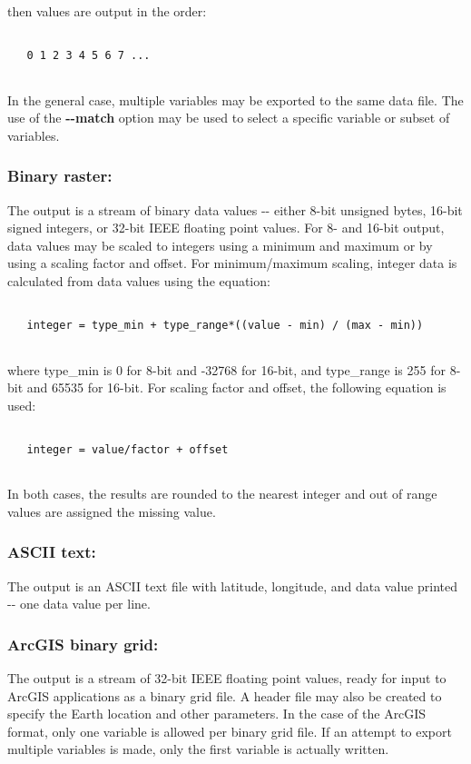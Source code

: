  then values are output in the order:
\begin{verbatim}

   0 1 2 3 4 5 6 7 ...
 
\end{verbatim}


  In the general case, multiple variables may be exported to the same data file. The use of the \textbf{-{-}match}
 option may be used to select a specific variable or subset of variables.
\subsubsection*{Binary raster:}


  The output is a stream of binary data values -{-} either 8-bit unsigned bytes, 16-bit signed integers, or 32-bit IEEE floating point values. For 8- and 16-bit output, data values may be scaled to integers using a minimum and maximum or by using a scaling factor and offset. For minimum/maximum scaling, integer data is calculated from data values using the equation:
\begin{verbatim}

   integer = type_min + type_range*((value - min) / (max - min))
 
\end{verbatim}


 where type\_min is 0 for 8-bit and -32768 for 16-bit, and type\_range is 255 for 8-bit and 65535 for 16-bit. For scaling factor and offset, the following equation is used:
\begin{verbatim}

   integer = value/factor + offset
 
\end{verbatim}


 In both cases, the results are rounded to the nearest integer and out of range values are assigned the missing value.
\subsubsection*{ASCII text:}


 The output is an ASCII text file with latitude, longitude, and data value printed -{-} one data value per line.
\subsubsection*{ArcGIS binary grid:}


 The output is a stream of 32-bit IEEE floating point values, ready for input to ArcGIS applications as a binary grid file. A header file may also be created to specify the Earth location and other parameters. In the case of the ArcGIS format, only one variable is allowed per binary grid file. If an attempt to export multiple variables is made, only the first variable is actually written.
